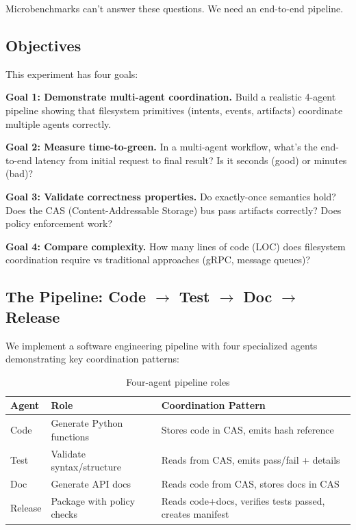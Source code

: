 \documentclass[11pt]{article}
\begin{document}
Microbenchmarks can't answer these questions. We need an end-to-end pipeline.

\subsection{Objectives}

This experiment has four goals:

\textbf{Goal 1: Demonstrate multi-agent coordination.} Build a realistic 4-agent pipeline showing that filesystem primitives (intents, events, artifacts) coordinate multiple agents correctly.

\textbf{Goal 2: Measure time-to-green.} In a multi-agent workflow, what's the end-to-end latency from initial request to final result? Is it seconds (good) or minutes (bad)?

\textbf{Goal 3: Validate correctness properties.} Do exactly-once semantics hold? Does the CAS (Content-Addressable Storage) bus pass artifacts correctly? Does policy enforcement work?

\textbf{Goal 4: Compare complexity.} How many lines of code (LOC) does filesystem coordination require vs traditional approaches (gRPC, message queues)?

\subsection{The Pipeline: Code $\rightarrow$ Test $\rightarrow$ Doc $\rightarrow$ Release}

We implement a software engineering pipeline with four specialized agents demonstrating key coordination patterns:

\begin{table}[h]
\centering
\begin{tabular}{llp{6cm}}
\toprule
\textbf{Agent} & \textbf{Role} & \textbf{Coordination Pattern} \\
\midrule
Code & Generate Python functions & Stores code in CAS, emits hash reference \\
Test & Validate syntax/structure & Reads from CAS, emits pass/fail + details \\
Doc & Generate API docs & Reads code from CAS, stores docs in CAS \\
Release & Package with policy checks & Reads code+docs, verifies tests passed, creates manifest \\
\bottomrule
\end{tabular}
\caption{Four-agent pipeline roles}
\end{table}
\end{document}
